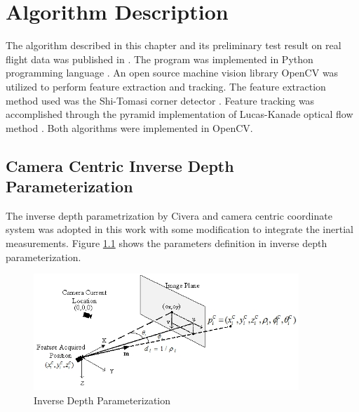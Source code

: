 \chapter{Algorithm Description}

The algorithm described in this chapter and its preliminary test
result on real flight data was published in
\cite{zhang_obstacle_2012}. The program was implemented in Python
programming language \cite{_python_????}. An open source machine
vision library OpenCV was utilized to perform feature extraction and
tracking. The feature extraction method used was the Shi-Tomasi corner
detector \cite{shi_good_1994}. Feature tracking was accomplished
through the pyramid implementation of Lucas-Kanade optical flow method
\cite{bouguet_pyramidal_1999}. Both algorithms were implemented in
OpenCV. 

\section{Camera Centric Inverse Depth Parameterization}
The inverse depth parametrization by Civera \cite{civera_inverse_2008}
and camera centric coordinate system was adopted in this work with
some modification to integrate the inertial measurements. Figure
\ref{fig:algo1} shows the parameters definition in inverse depth
parameterization.

\begin{figure}[h]
\centering
\includegraphics[width=10cm, keepaspectratio=true]{./Figures/idp.jpg}
\caption{Inverse Depth Parameterization}
\label{fig:algo1}
\end{figure}

